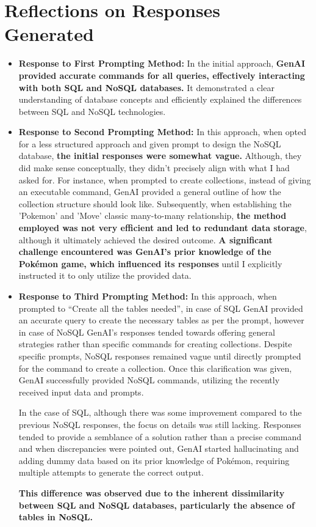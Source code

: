 \documentclass[10pt,onecolumn,letterpaper]{article}
\begin{document}
\section{Reflections on Responses Generated}
\begin{itemize}
    \item \textbf{Response to First Prompting Method:}
	In the initial approach, \textbf{GenAI provided accurate commands for all queries, effectively interacting with both SQL and NoSQL databases.} It demonstrated a clear understanding of database concepts and efficiently explained the differences between SQL and NoSQL technologies.
    
    \item \textbf{Response to Second Prompting Method:}
	In this approach, when opted for a less structured approach and given prompt to design the NoSQL database, \textbf{the initial responses were somewhat vague.} Although, they did make sense conceptually, they didn't precisely align with what I had asked for. For instance, when prompted to create collections, instead of giving an executable command, GenAI provided a general outline of how the collection structure should look like. Subsequently, when establishing the 'Pokemon' and 'Move' classic many-to-many relationship, \textbf{the method employed was not very efficient and led to redundant data storage}, although it ultimately achieved the desired outcome. \textbf{A significant challenge encountered was GenAI's prior knowledge of the Pokémon game, which influenced its responses} until I explicitly instructed it to only utilize the provided data.

     \item \textbf{Response to Third Prompting Method:}
     In this approach, when prompted to “Create all the tables needed”, in case of SQL GenAI provided an accurate query to create the necessary tables as per the prompt, however in case of NoSQL GenAI’s responses tended towards offering general strategies rather than specific commands for creating collections. Despite specific prompts, NoSQL responses remained vague until directly prompted for the command to create a collection. Once this clarification was given, GenAI successfully provided NoSQL commands, utilizing the recently received input data and prompts.
     
     In the case of SQL, although there was some improvement compared to the previous NoSQL responses, the focus on details was still lacking. Responses tended to provide a semblance of a solution rather than a precise command and when discrepancies were pointed out, GenAI started hallucinating and adding dummy data based on its prior knowledge of Pokémon, requiring multiple attempts to generate the correct output.
     
      \textbf{This difference was observed due to the inherent dissimilarity between SQL and NoSQL databases, particularly the absence of tables in NoSQL.}
\end{itemize}
\end{document}
